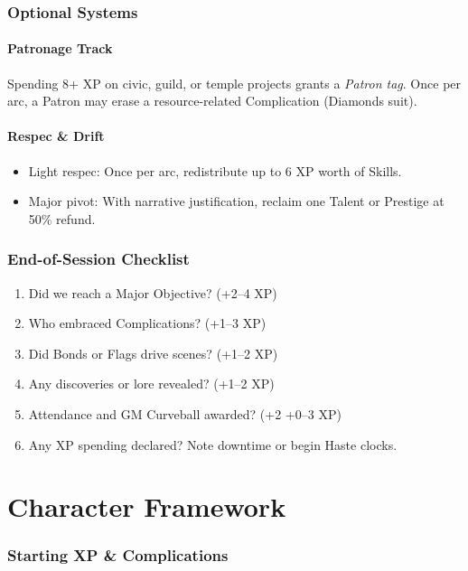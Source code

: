 \documentclass[12pt]{article}
\begin{document}
\section{Optional Systems}

\subsection*{Patronage Track}
Spending 8+ XP on civic, guild, or temple projects grants a \emph{Patron tag}.  
Once per arc, a Patron may erase a resource-related Complication (Diamonds suit).

\subsection*{Respec \& Drift}
\begin{itemize}
  \item Light respec: Once per arc, redistribute up to 6 XP worth of Skills.  
  \item Major pivot: With narrative justification, reclaim one Talent or Prestige at 50\% refund.  
\end{itemize}

\section{End-of-Session Checklist}

\begin{enumerate}
  \item Did we reach a Major Objective? (+2--4 XP)  
  \item Who embraced Complications? (+1--3 XP)  
  \item Did Bonds or Flags drive scenes? (+1--2 XP)  
  \item Any discoveries or lore revealed? (+1--2 XP)  
  \item Attendance and GM Curveball awarded? (+2 +0--3 XP)  
  \item Any XP spending declared? Note downtime or begin Haste clocks.  
\end{enumerate}


\part{Character Framework}

\section{Starting XP \& Complications}
\end{document}
